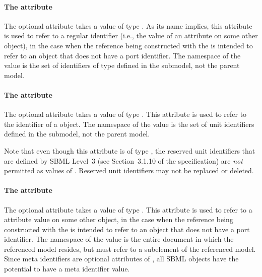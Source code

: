 \paragraph{The \fixttspace{} attribute}
\label{sbaseref-idref}

The optional attribute  takes a value of type
.  As its name implies, this attribute is used to
refer to a regular identifier (i.e., the value of an 
attribute on some other object), in the case when the reference being
constructed with the \SBaseRef is intended to refer to an object that
does not have a port identifier.  The namespace of the 
value is the set of identifiers of type  defined in the
submodel, not the parent model.


\paragraph{The \fixttspace{} attribute}
\label{sbaseref-unitref}

The optional attribute  takes a value of type
.  This attribute is used to refer to the identifier
of a \UnitDefinition object.  The namespace of the 
value is the set of unit identifiers defined in the submodel, not the
parent model.

Note that even though this attribute is of type ,
the reserved unit identifiers that are defined by SBML Level~3 (see
Section~3.1.10 of the \sbmlthreecore specification) are
\emph{not} permitted as values of .  Reserved unit
identifiers may not be replaced or deleted.


\paragraph{The \fixttspace{} attribute}
\label{sbaseref-metaidref}

The optional attribute  takes a value of type 
.  This attribute is used to refer to a 
attribute value on some other object, in the case when the reference
being constructed with the \SBaseRef is intended to refer to an object
that does not have a port identifier.  The namespace of the 
value is the entire document in which the referenced model resides, but
must refer to a subelement of the referenced model.  Since meta identifiers are
optional attributes of \SBase, all SBML objects have the potential to
have a meta identifier value.


